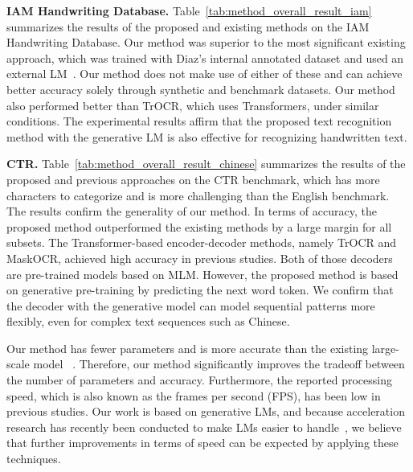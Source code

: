 \documentclass[10pt,twocolumn,letterpaper]{article}
\begin{document}
\noindent
\textbf{IAM Handwriting Database.}
Table~\ref{tab:method_overall_result_iam} summarizes the results of the proposed and existing methods on the IAM Handwriting Database. 
Our method was superior to the most significant existing approach, which was trained with Diaz's internal annotated dataset and used an external LM~\cite{diaz2021rethinking}. 
Our method does not make use of either of these and can achieve better accuracy solely through synthetic and benchmark datasets.
Our method also performed better than TrOCR, which uses Transformers, under similar conditions. 
The experimental results affirm that the proposed text recognition method with the generative LM is also effective for recognizing handwritten text.


\noindent
\textbf{CTR.}
Table~\ref{tab:method_overall_result_chinese} summarizes the results of the proposed and previous approaches on the CTR benchmark, which has more characters to categorize and is more challenging than the English benchmark. The results confirm the generality of our method.
In terms of accuracy, the proposed method outperformed the existing methods by a large margin for all subsets.
The Transformer-based encoder-decoder methods, namely TrOCR and MaskOCR, achieved high accuracy in previous studies.
Both of those decoders are pre-trained models based on MLM.
However, the proposed method is based on generative pre-training by predicting the next word token.
We confirm that the decoder with the generative model can model sequential patterns more flexibly, even for complex text sequences such as Chinese.


Our method has fewer parameters and is more accurate than the existing large-scale model ~\cite{lyu2022maskocr}.
Therefore, our method significantly improves the tradeoff between the number of parameters and accuracy.
Furthermore, the reported processing speed, which is also known as the frames per second (FPS), has been low in previous studies.
Our work is based on generative LMs, and because acceleration research has recently been conducted to make LMs easier to handle~\cite{dettmers2022llm}, we believe that further improvements in terms of speed can be expected by applying these techniques.
\end{document}
